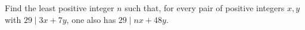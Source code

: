 Find the least positive integer $n$ such that, for every pair of positive integers $x,y$ with $29\mid3x+7y$, one also has $29\mid nx+48y$.
